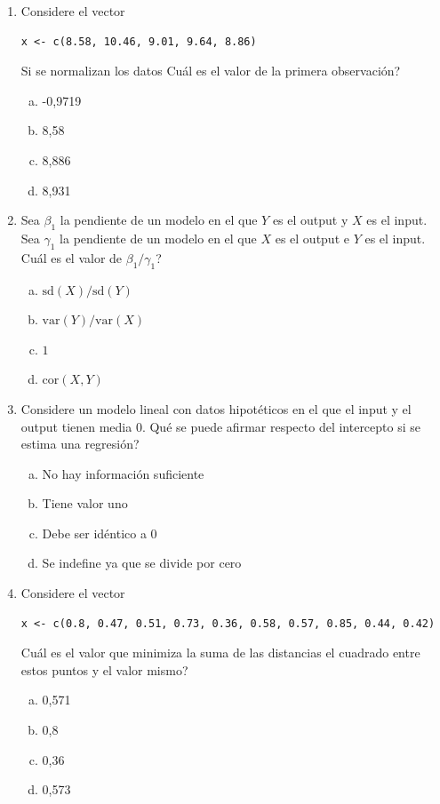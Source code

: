 \documentclass[11pt,oneside,spanish]{article}
\theoremstyle{definition}
\theoremstyle{definition}\newtheorem{definicion}{Definicin}
\theoremstyle{definition}\newtheorem{ejemplo}{Ejemplo}
\theoremstyle{remark}\newtheorem{nota}{\textsc{Nota}}
\theoremstyle{definition}\newtheorem{proposicion}{Proposicin}
\theoremstyle{definition}\newtheorem{problema}{Problema}
\begin{document}
\begin{enumerate}[(1)]
\newpage

\item Considere el vector 
\begin{lstlisting}[backgroundcolor=\color{Gray!20},frame=none,basicstyle=\ttfamily]
 x <- c(8.58, 10.46, 9.01, 9.64, 8.86)
\end{lstlisting}
Si se normalizan los datos {\textquestiondown}Cu\'al es el valor de la primera observaci\'on?	
	\begin{enumerate}[(a)]
	\item -0,9719
	\item 8,58
	\item 8,886
	\item 8,931
	\end{enumerate}

\item Sea $\beta_1$ la pendiente de un modelo en el que $Y$ es el output y $X$ es el input. Sea $\gamma_1$ la pendiente de un modelo en el que $X$ es el output e $Y$ es el input. {\textquestiondown}Cu\'al es el valor de $\beta_1 / \gamma_1$?		
	\begin{enumerate}[(a)]
	\item $\text{sd}(X)/\text{sd}(Y)$
	\item $\text{var}(Y)/\text{var}(X)$
	\item $1$
	\item $\text{cor}(X,Y)$
	\end{enumerate}
	
\item Considere un modelo  lineal con datos hipot\'eticos en el que el input y el output tienen media 0. {\textquestiondown}Qu\'e se puede afirmar respecto del intercepto si se estima una regresi\'on?		
	\begin{enumerate}[(a)]
	\item No hay informaci\'on suficiente
	\item Tiene valor uno
	\item Debe ser id\'entico a 0
	\item Se indefine ya que se divide por cero
	\end{enumerate}	

\item Considere el vector
\begin{lstlisting}[backgroundcolor=\color{Gray!20},frame=none,basicstyle=\ttfamily]
 x <- c(0.8, 0.47, 0.51, 0.73, 0.36, 0.58, 0.57, 0.85, 0.44, 0.42)
\end{lstlisting}
{\textquestiondown}Cu\'al es el valor que minimiza la suma de las distancias el cuadrado entre estos puntos y el valor mismo?
	\begin{enumerate}[(a)]
	\item 0,571
	\item 0,8
	\item 0,36
	\item 0,573
	\end{enumerate}


\end{enumerate}
\end{document}
